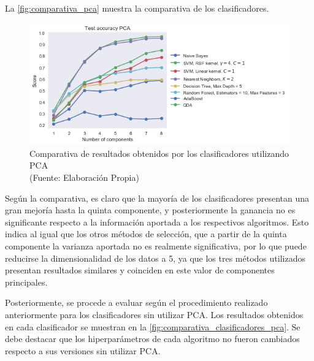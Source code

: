 La \autoref{fig:comparativa_pca} muestra la comparativa de los clasificadores.

\begin{figure}[ht!]
\centering
\includegraphics[width=.8\textwidth]{figures/comparativa_clasificadores_pca.png}
\caption[Comparativa de resultados obtenidos por los clasificadores utilizando PCA]{Comparativa de resultados obtenidos por los clasificadores utilizando PCA  \\
{\scriptsize (Fuente: Elaboración Propia)}}
\label{fig:comparativa_pca}
\end{figure}

Según la comparativa, es claro que la mayoría de los clasificadores presentan una gran mejoría hasta la quinta componente, y posteriormente la ganancia no es significante respecto a la información aportada a los respectivos algoritmos. Esto indica al igual que los otros métodos de selección, que a partir de la quinta componente la varianza aportada no es realmente significativa, por lo que puede reducirse la dimensionalidad de los datos a 5, ya que los tres métodos utilizados presentan resultados similares y coinciden en este valor de componentes principales.

Posteriormente, se procede a evaluar según el procedimiento realizado anteriormente para los clasificadores sin utilizar PCA. Los resultados obtenidos en cada clasificador se muestran en la \autoref{fig:comparativa_clasificadores_pca}. Se debe destacar que los hiperparámetros de cada algoritmo no fueron cambiados respecto a sus versiones sin utilizar PCA.

\newpage


